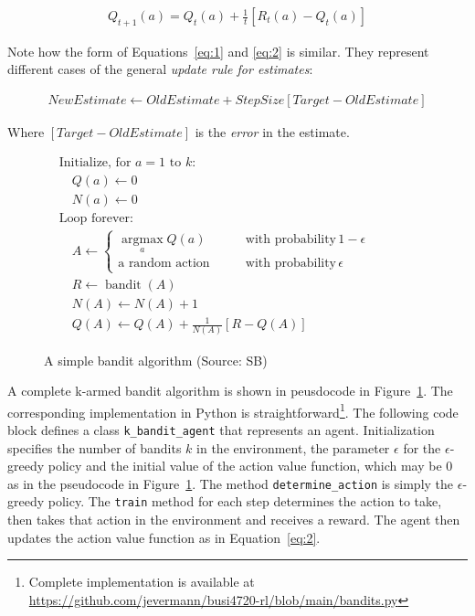 \begin{align}
Q_{t+1}(a) = Q_t(a) + \frac{1}{t}\left[R_t(a) - Q_t(a)\right] \label{eq:2}
\end{align}

Note how the form of Equations~\ref{eq:1} and \ref{eq:2} is similar. They represent different cases of the general \emph{update rule for estimates}:

\begin{align*}
NewEstimate \leftarrow OldEstimate + StepSize \left[ Target - OldEstimate \right]
\end{align*}

Where $\left[ Target - OldEstimate \right]$ is the \emph{error} in the estimate.

\begin{figure}
\begin{tcolorbox}[colback=code]
\begin{align*}
&\text{Initialize, for $a=1$ to $k$:}\\
&\quad Q(a) \leftarrow 0 \\
&\quad N(a) \leftarrow 0 \\
&\text{Loop forever:} \\
&\quad A \leftarrow \begin{cases} \operatorname*{arg max}_a Q(a) &\qquad \text{with probability}\, 1-\epsilon \\
\text{a random action} &\qquad \text{with probability} 
\, \epsilon
\end{cases} \hspace{1in} \\
&\quad R \leftarrow \operatorname{bandit}(A) \\
&\quad N(A) \leftarrow N(A) + 1 \\
&\quad Q(A) \leftarrow Q(A) + \frac{1}{N(A)} \left[ R - Q(A) \right]
\end{align*}
\end{tcolorbox}
\caption{A simple bandit algorithm (Source: SB)}
\label{fig:karmedbandit}
\end{figure}

A complete k-armed bandit algorithm is shown in peusdocode in Figure~\ref{fig:karmedbandit}. The corresponding implementation in Python is straightforward\footnote{Complete implementation is available at \url{https://github.com/jevermann/busi4720-rl/blob/main/bandits.py}}. The following code block defines a class \texttt{k\_bandit\_agent} that represents an agent. Initialization specifies the number of bandits $k$ in the environment, the parameter $\epsilon$ for the $\epsilon$-greedy policy and the initial value of the action value function, which may be 0 as in the pseudocode in Figure~\ref{fig:karmedbandit}. The method \texttt{determine\_action} is simply the $\epsilon$-greedy policy. The \texttt{train} method for each step determines the action to take, then takes that action in the environment and receives a reward. The agent then updates the action value function as in Equation~\ref{eq:2}.

